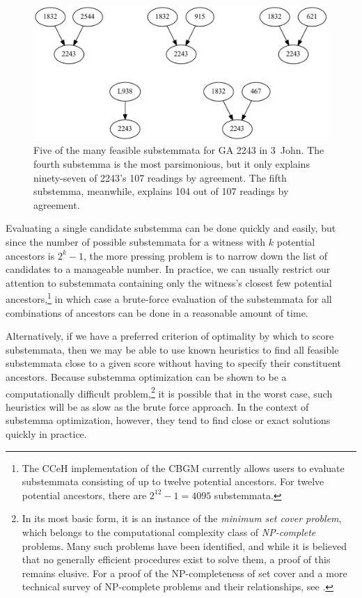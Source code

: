 \documentclass[a4paper, 12pt]{article}
\begin{document}
	\begin{figure}[h!]
		\centering
		\includegraphics[scale=0.6666]{../graphics/substemmata.pdf}
		\caption{Five of the many feasible substemmata for GA 2243 in 3~John. The fourth substemma is the most parsimonious, but it only explains ninety-seven of 2243's 107 readings by agreement. The fifth substemma, meanwhile, explains 104 out of 107 readings by agreement.}
		\label{fig:substemmata}
	\end{figure}
	
	\newpage
	
	Evaluating a single candidate substemma can be done quickly and easily, but since the number of possible substemmata for a witness with $k$ potential ancestors is $2^k -1$, the more pressing problem is to narrow down the list of candidates to a manageable number. In practice, we can usually restrict our attention to substemmata containing only the witness's closest few potential ancestors,\footnote{The CCeH implementation of the CBGM currently allows users to evaluate substemmata consisting of up to twelve potential ancestors. For twelve potential ancestors, there are $2^{12} - 1 = 4095$ substemmata.} in which case a brute-force evaluation of the substemmata for all combinations of ancestors can be done in a reasonable amount of time.
	
	Alternatively, if we have a preferred criterion of optimality by which to score substemmata, then we may be able to use known heuristics to find all feasible substemmata close to a given score without having to specify their constituent ancestors. Because substemma optimization can be shown to be a computationally difficult problem,\footnote{In its most basic form, it is an instance of the \emph{minimum set cover problem}, which belongs to the computational complexity class of \emph{NP-complete} problems. Many such problems have been identified, and while it is believed that no generally efficient procedures exist to solve them, a proof of this remains elusive. For a proof of the NP-completeness of set cover and a more technical survey of NP-complete problems and their relationships, see \cite{Karp72}.} it is possible that in the worst case, such heuristics will be as slow as the brute force approach. In the context of substemma optimization, however, they tend to find close or exact solutions quickly in practice.
	
\end{document}
